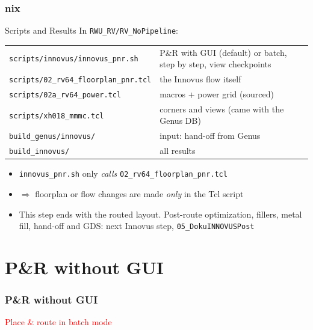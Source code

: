 \documentclass{beamer}
\newcommand{\astitle}{nix}
\newcommand{\assubtitle}{nix}
\newcommand{\cmd}[1]{\texttt{#1}}
\begin{document}
\renewcommand{\assubtitle}{Scripts and Results}
\begin{frame}
\frametitle{\astitle}
\begin{block}{\assubtitle}
  \footnotesize
  In \cmd{RWU\_RV/RV\_NoPipeline}:\\[3pt]
  \begin{tabularx}{\linewidth}{@{}lY@{}}
    \cmd{scripts/innovus/innovus\_pnr.sh}   & P\&R with GUI (default) or batch,
                                              step by step, view checkpoints\\[2pt]
    \cmd{scripts/02\_rv64\_floorplan\_pnr.tcl} & the Innovus flow itself\\[2pt]
    \cmd{scripts/02a\_rv64\_power.tcl}    & macros + power grid (sourced)\\[2pt]
    \cmd{scripts/xh018\_mmmc.tcl}           & corners and views (came with the Genus DB)\\[2pt]
    \cmd{build\_genus/innovus/}             & input: hand-off from Genus\\[2pt]
    \cmd{build\_innovus/}                   & all results\\
  \end{tabularx}
  \vspace{4pt}
  \begin{itemize}
    \item \cmd{innovus\_pnr.sh} only \emph{calls} \cmd{02\_rv64\_floorplan\_pnr.tcl}
    \item $\Rightarrow$ floorplan or flow changes are made \emph{only} in
      the Tcl script
    \item This step ends with the routed layout. Post-route optimization,
      fillers, metal fill, hand-off and GDS: next Innovus step,
      \cmd{05\_DokuINNOVUSPost}
  \end{itemize}
\end{block}
\end{frame}

\section{P\&R without GUI}
\renewcommand{\astitle}{P\&R without GUI}
\begin{frame}
\frametitle{\astitle}
\textcolor{red}{Place \& route in batch mode}
\end{frame}
\end{document}
